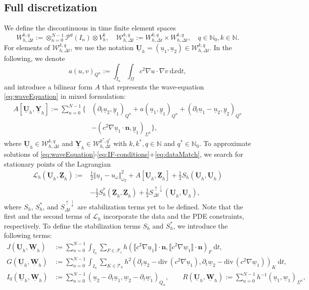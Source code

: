 \documentclass[sn-mathphys-num]{sn-jnl}
\numberwithin{equation}{section}
\newcommand{\jump}[1]{\llbracket#1\rrbracket}
\newcommand{\cL}{\mathcal{L}}
\renewcommand{\div}{\mathrm{div}\,}  %
\newcommand{\dT}{\mathrm{d}t}
\newcommand{\dX}{\mathrm{d}x}
\newcommand{\FullyDiscrSpace}[2]{ W^{ {#1},{#2}}_{h, \Delta t  } }
\newcommand{\ProdFullyDiscrSpace}[2]{ \mathcal{W}^{ {#1},{#2}}_{h, \Delta t  } }
\newcommand{\Uh}{\underline{\mathbf{U}}_h}
\newcommand{\Yh}{\underline{\mathbf{Y}}_h}
\newcommand{\Zh}{\underline{\mathbf{Z}}_h}
\newcommand{\Wh}{\underline{\mathbf{W}}_h}
\newcommand{\ul}{\underline{u}}
\newcommand{\yl}{\underline{y}}
\newcommand{\wl}{\underline{w}}
\newcommand{\Sud}{S^{\uparrow \downarrow}_{\Delta t}}
\newcommand{\dt}{\partial_t}
\begin{document}
\subsection{Full discretization}\label{sec:method}
 We define the discontinuous in time finite element spaces 
\begin{equation}
    \FullyDiscrSpace{k}{q} := \otimes_{n = 0}^{N-1} \mathcal{P}^q(I_n) \otimes V_h^k, \quad \ProdFullyDiscrSpace{k}{q} :=  \FullyDiscrSpace{k}{q} \times \FullyDiscrSpace{k}{q}, \quad q \in \mathbb{N}_0, k \in \mathbb{N}. 
\end{equation}
For elements of $\ProdFullyDiscrSpace{k}{q}$, we use the notation $\Uh = (\ul_1,\ul_2) \in \ProdFullyDiscrSpace{k}{q}$. In the following, we denote
\begin{equation*}
    a(u,v)_{Q^n} := \int_{I_n} \int_{\Omega} c^2 \nabla u \cdot \nabla v \ \dX \dT,
\end{equation*}
and introduce a bilinear form $A$ that represents the wave-equation \eqref{eq:waveEquation} in mixed formulation:  
\begin{equation}
    \begin{aligned}
        A[\Uh,\Yh] := \sum_{n = 0}^{N -1} \Big\{ &(\dt \ul_2, \yl_1)_{Q^n} + a(\ul_1,\yl_1)_{Q^n} + (\dt \ul_1 - \ul_2,\yl_2)_{Q^n} \\
        &- (c^2 \nabla \ul_1 \cdot \mathbf{n}, \yl_1)_{\Sigma^n} \Big\},
    \end{aligned}
\end{equation} 
where $\Uh \in \ProdFullyDiscrSpace{k}{q}$ and $\Yh \in \ProdFullyDiscrSpace{k^\ast}{q^\ast}$ with $k, k^\ast, q \in \mathbb{N}$ and $q^\ast \in \mathbb{N}_0$. 
To approximate solutions of \eqref{eq:waveEquation}-\eqref{eq:IF-conditions}+\eqref{eq:dataMatch}, we search for stationary points of the Lagrangian 
\begin{align*}
    \cL_h (\Uh, \Zh) := &\frac{1}{2} \Vert \ul_1 - u_{\omega} \Vert^2_{\omega_T} + A[\Uh,\Zh] + \frac{1}{2}  S_h(\Uh,\Uh) \\
    &- \frac{1}{2}  S_h^\ast(\Zh,\Zh) + \frac{1}{2} \Sud(\Uh,\Uh),
\end{align*}
where $S_h$, $S_h^\ast$, and $\Sud$ are stabilization terms yet to be defined. Note that the first and the second terms of $\cL_h$ incorporate the data and the PDE constraints, respectively. To define the stabilization terms $S_h$ and $S_h^\ast$, we introduce the following terms: 
\begin{align*}
    J(\Uh,\Wh) &:= \sum_{n = 0}^{N -1} \int_{I_n} \sum_{F \in \mathcal{F}_i} h (\jump{c^2 \nabla \ul_1}  \cdot \mathbf{n}, \jump{c^2 \nabla \wl_1}  \cdot \mathbf{n})_F \ \dT, \\
    G(\Uh,\Wh) &:= \sum_{n = 0}^{N -1} \int_{I_n} \sum_{K \in \mathcal{T}_h} h^2 (\dt \ul_2 - \div (c^2 \nabla \ul_1),\dt \wl_2 -\div( c^2 \nabla \wl_1))_K \ \dT, \\
    I_0(\Uh,\Wh) &:= \sum_{n = 0}^{N -1} (\ul_2 - \dt \ul_1, \wl_2-\dt \wl_1)_{Q_n}, \qquad 
    R(\Uh,\Wh) := \sum_{n = 0}^{N -1} h^{-1} (\ul_1,\wl_1)_{\Sigma^n},
\end{align*}
\end{document}
